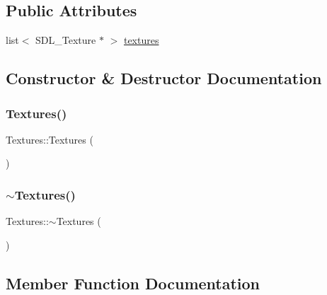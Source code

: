 \subsection*{Public Attributes}
\begin{DoxyCompactItemize}
\item 
list$<$ S\+D\+L\+\_\+\+Texture $\ast$ $>$ \mbox{\hyperlink{class_textures_ad7467bd1532706adc0a2ee0db1c227c6}{textures}}
\end{DoxyCompactItemize}


\subsection{Constructor \& Destructor Documentation}
\mbox{\label{class_textures_a43eceaf4fb6fa052e1c41cebb7b18189}} 
\subsubsection{\texorpdfstring{Textures()}{Textures()}}
{\footnotesize\ttfamily Textures\+::\+Textures (\begin{DoxyParamCaption}{ }\end{DoxyParamCaption})}

\mbox{\label{class_textures_aa1480566dae8b3a6de5e6c98d9fdc225}} 
\subsubsection{\texorpdfstring{$\sim$Textures()}{~Textures()}}
{\footnotesize\ttfamily Textures\+::$\sim$\+Textures (\begin{DoxyParamCaption}{ }\end{DoxyParamCaption})\hspace{0.3cm}{\ttfamily [virtual]}}



\subsection{Member Function Documentation}
\mbox{\label{class_textures_a3956f023ff27addfed10285805ee7f61}} 
